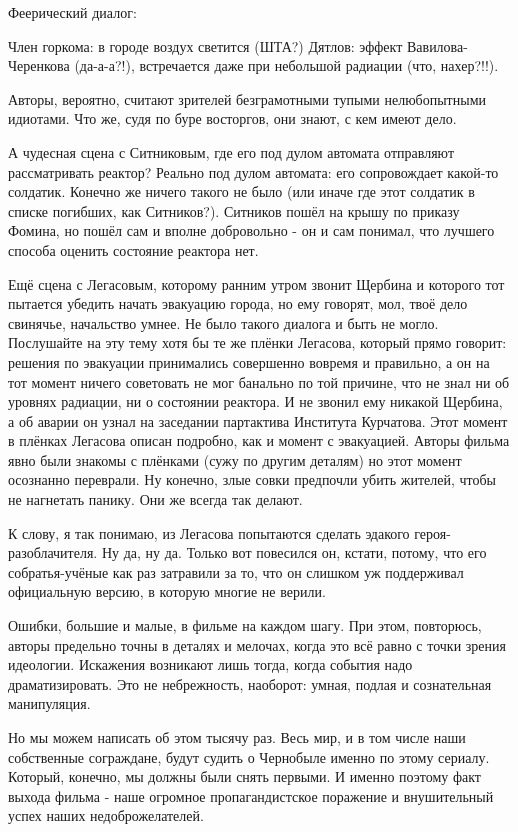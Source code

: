 Феерический диалог:

Член горкома: в городе воздух светится (ШТА?) Дятлов: эффект Вавилова-Черенкова
(да-а-а?!), встречается даже при небольшой радиации (что, нахер?!!).

Авторы, вероятно, считают зрителей безграмотными тупыми нелюбопытными идиотами.
Что же, судя по буре восторгов, они знают, с кем имеют дело.

А чудесная сцена с Ситниковым, где его под дулом автомата отправляют
рассматривать реактор? Реально под дулом автомата: его сопровождает какой-то
солдатик. Конечно же ничего такого не было (или иначе где этот солдатик в
списке погибших, как Ситников?). Ситников пошёл на крышу по приказу Фомина, но
пошёл сам и вполне добровольно - он и сам понимал, что лучшего способа оценить
состояние реактора нет.

Ещё сцена с Легасовым, которому ранним утром звонит Щербина и которого тот
пытается убедить начать эвакуацию города, но ему говорят, мол, твоё дело
свинячье, начальство умнее. Не было такого диалога и быть не могло. Послушайте
на эту тему хотя бы те же плёнки Легасова, который прямо говорит: решения по
эвакуации принимались совершенно вовремя и правильно, а он на тот момент ничего
советовать не мог банально по той причине, что не знал ни об уровнях радиации,
ни о состоянии реактора. И не звонил ему никакой Щербина, а об аварии он узнал
на заседании партактива Института Курчатова. Этот момент в плёнках Легасова
описан подробно, как и момент с эвакуацией. Авторы фильма явно были знакомы с
плёнками (сужу по другим деталям) но этот момент осознанно переврали. Ну
конечно, злые совки предпочли убить жителей, чтобы не нагнетать панику. Они же
всегда так делают.

К слову, я так понимаю, из Легасова попытаются сделать эдакого
героя-разоблачителя. Ну да, ну да. Только вот повесился он, кстати, потому, что
его собратья-учёные как раз затравили за то, что он слишком уж поддерживал
официальную версию, в которую многие не верили.

Ошибки, большие и малые, в фильме на каждом шагу. При этом, повторюсь, авторы
предельно точны в деталях и мелочах, когда это всё равно с точки зрения
идеологии. Искажения возникают лишь тогда, когда события надо драматизировать.
Это не небрежность, наоборот: умная, подлая и сознательная манипуляция.

Но мы можем написать об этом тысячу раз. Весь мир, и в том числе наши
собственные сограждане, будут судить о Чернобыле именно по этому сериалу.
Который, конечно, мы должны были снять первыми. И именно поэтому факт выхода
фильма - наше огромное пропагандистское поражение и внушительный успех наших
недоброжелателей.
